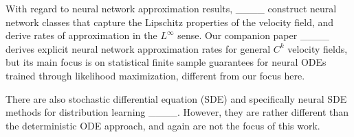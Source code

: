     
    
    
    
    
    
    



With regard to neural network approximation results, ____
    construct neural network classes that capture the  Lipschitz properties of the velocity field, and derive rates of approximation in the $L^\infty$ sense. Our companion paper ____ derives explicit neural network approximation rates for general $C^k$ velocity fields, but its main focus is on statistical finite sample guarantees for neural ODEs trained through likelihood maximization, different from our focus here. 
    

  
    

There are also stochastic differential equation (SDE) and specifically neural SDE methods for distribution learning ____. However, they are rather different than the deterministic ODE approach, and again are not the focus of this work.
    














